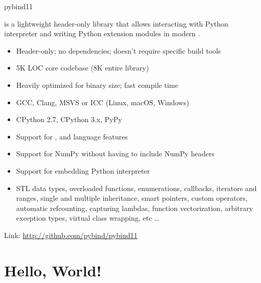 \documentclass[10pt]{beamer}
\newcommand\cpp[1]{\cpluspluslogo #1}
\newcommand\mono[1]{\texttt{\footnotesize{\detokenize{#1}}}\xspace}
\newcommand\pybind{\mono{pybind11}}
\begin{document}
\begin{frame}{pybind11}

    \pybind is a lightweight header-only library that allows
    interacting with Python interpreter and writing Python
    extension modules in modern \cpp{}.

    \begin{itemize}
        \item \pause Header-only; no dependencies; doesn't require specific build tools
        \item \pause 5K LOC core codebase (8K entire library)
        \item \pause Heavily optimized for binary size; fast compile time
        \item \pause GCC, Clang, MSVS or ICC (Linux, macOS, Windows)
        \item \pause CPython 2.7, CPython 3.x, \alert<7>{PyPy} \pause
        \item \pause Support for \cpp{11}, \cpp{14} and \cpp{17} language features
        \item \pause Support for NumPy without having to include NumPy headers
        \item \pause Support for embedding Python interpreter
        \item \pause \small{
                STL data types, overloaded functions, enumerations,
                callbacks, iterators and ranges, single and multiple inheritance,
                smart pointers, custom operators, automatic refcounting, capturing
                lambdas, function vectorization, arbitrary exception types, virtual
                class wrapping, etc \ldots
            }
    \end{itemize}

    Link: \url{http://github.com/pybind/pybind11}

\end{frame}


\section{Hello, World!}

\end{document}
